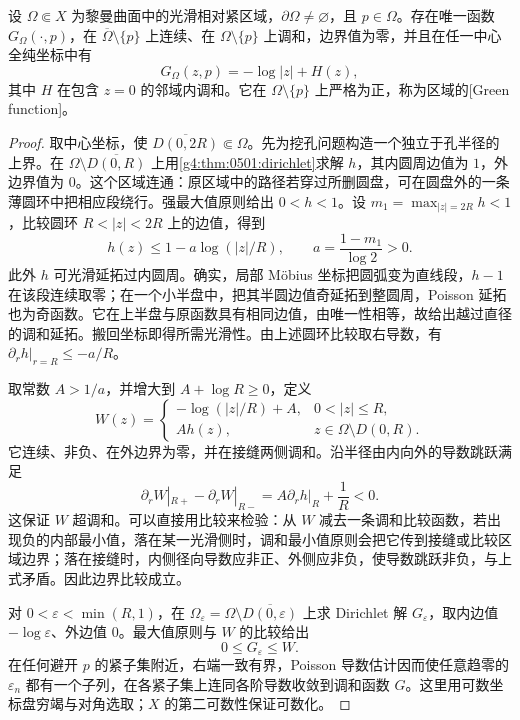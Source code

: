 \begin{theorem}
	\label{g4:thm:0501:green}
	设 \(\Omega\Subset X\) 为黎曼曲面中的光滑相对紧区域，\(\partial\Omega\ne\varnothing\)，且 \(p\in\Omega\)。存在唯一函数 \(G_\Omega(\cdot,p)\)，在 \(\overline\Omega\setminus\{p\}\) 上连续、在 \(\Omega\setminus\{p\}\) 上调和，边界值为零，并且在任一中心全纯坐标中有
	\begin{equation}
		\label{g4:eq:0501:green-local}
		G_\Omega(z,p)=-\log|z|+H(z),
	\end{equation}
	其中 \(H\) 在包含 \(z=0\) 的邻域内调和。它在 \(\Omega\setminus\{p\}\) 上严格为正，称为区域的[Green function]。
\end{theorem}
\begin{proof}
	取中心坐标，使 \(\overline{D(0,2R)}\Subset\Omega\)。先为挖孔问题构造一个独立于孔半径的上界。在 \(\Omega\setminus\overline{D(0,R)}\) 上用\cref{g4:thm:0501:dirichlet}求解 \(h\)，其内圆周边值为 \(1\)，外边界值为 \(0\)。这个区域连通：原区域中的路径若穿过所删圆盘，可在圆盘外的一条薄圆环中把相应段绕行。强最大值原则给出 \(0<h<1\)。设 \(m_1=\max_{|z|=2R}h<1\)，比较圆环 \(R<|z|<2R\) 上的边值，得到
	\[
		h(z)\le1-a\log(|z|/R),\qquad
		a=\frac{1-m_1}{\log2}>0.
	\]
	此外 \(h\) 可光滑延拓过内圆周。确实，局部 Möbius 坐标把圆弧变为直线段，\(h-1\) 在该段连续取零；在一个小半盘中，把其半圆边值奇延拓到整圆周，Poisson 延拓也为奇函数。它在上半盘与原函数具有相同边值，由唯一性相等，故给出越过直径的调和延拓。搬回坐标即得所需光滑性。由上述圆环比较取右导数，有 \(\partial_rh|_{r=R}\le-a/R\)。

	取常数 \(A>1/a\)，并增大到 \(A+\log R\ge0\)，定义
	\[
		W(z)=
		\begin{cases}
			-\log(|z|/R)+A,&0<|z|\le R,\\
			Ah(z),&z\in\Omega\setminus D(0,R).
		\end{cases}
	\]
	它连续、非负、在外边界为零，并在接缝两侧调和。沿半径由内向外的导数跳跃满足
	\[
		\partial_rW|_{R+}-\partial_rW|_{R-}
		=A\partial_rh|_R+\frac1R<0.
	\]
	这保证 \(W\) 超调和。可以直接用比较来检验：从 \(W\) 减去一条调和比较函数，若出现负的内部最小值，落在某一光滑侧时，调和最小值原则会把它传到接缝或比较区域边界；落在接缝时，内侧径向导数应非正、外侧应非负，使导数跳跃非负，与上式矛盾。因此边界比较成立。

	对 \(0<\varepsilon<\min(R,1)\)，在 \(\Omega_\varepsilon=\Omega\setminus\overline{D(0,\varepsilon)}\) 上求 Dirichlet 解 \(G_\varepsilon\)，取内边值 \(-\log\varepsilon\)、外边值 \(0\)。最大值原则与 \(W\) 的比较给出
	\[
		0\le G_\varepsilon\le W.
	\]
	在任何避开 \(p\) 的紧子集附近，右端一致有界，Poisson 导数估计因而使任意趋零的 \(\varepsilon_n\) 都有一个子列，在各紧子集上连同各阶导数收敛到调和函数 \(G\)。这里用可数坐标盘穷竭与对角选取；\(X\) 的第二可数性保证可数化。


\end{proof}
